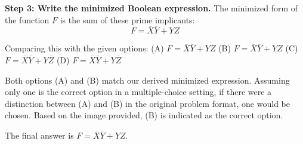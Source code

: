 \documentclass[a4paper,12pt]{article}
\begin{document}
\vspace{0.2cm}

\textbf{Step 3: Write the minimized Boolean expression.}
The minimized form of the function $F$ is the sum of these prime implicants:
$$ F = \overline{X}\overline{Y} + YZ $$

Comparing this with the given options:
(A) $F = \overline{X}\overline{Y} + YZ$
(B) $F = \overline{X}\overline{Y} + YZ$
(C) $F = \overline{X}\overline{Y} + Y\overline{Z}$
(D) $F = \overline{X}\overline{Y} + Y\overline{Z}$

Both options (A) and (B) match our derived minimized expression. Assuming only one is the correct option in a multiple-choice setting, if there were a distinction between (A) and (B) in the original problem format, one would be chosen. Based on the image provided, (B) is indicated as the correct option.

The final answer is $\boxed{F = \overline{X}\overline{Y} + YZ}$.
\end{document}
